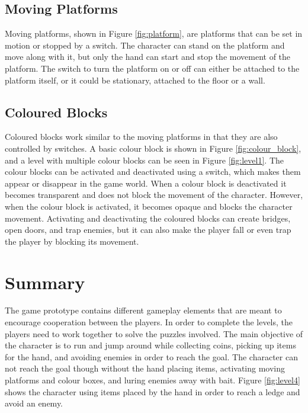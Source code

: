 \subsection{Moving Platforms}


Moving platforms, shown in Figure \ref{fig:platform}, are platforms that can be set in motion or stopped by a switch. The character can stand on the platform and move along with it, but only the hand can start and stop the movement of the platform. The switch to turn the platform on or off can either be attached to the platform itself, or it could be stationary, attached to the floor or a wall.

\subsection{Coloured Blocks}


 Coloured blocks work similar to the moving platforms in that they are also controlled by switches. A basic colour block is shown in Figure \ref{fig:colour_block}, and a level with multiple colour blocks can be seen in Figure \ref{fig:level1}. The colour blocks can be activated and deactivated using a switch, which makes them appear or disappear in the game world. When a colour block is deactivated it becomes transparent and does not block the movement of the character. However, when the colour block is activated, it becomes opaque and blocks the character movement. Activating and deactivating the coloured blocks can create bridges, open doors, and trap enemies, but it can also make the player fall or even trap the player by blocking its movement.

\section{Summary}
The game prototype contains different gameplay elements that are meant to encourage cooperation between the players. In order to complete the levels, the players need to work together to solve the puzzles involved. The main objective of the character is to run and jump around while collecting coins, picking up items for the hand, and avoiding enemies in order to reach the goal. The character can not reach the goal though without the hand placing items, activating moving platforms and colour boxes, and luring enemies away with bait. Figure \ref{fig:level4} shows the character using items placed by the hand in order to reach a ledge and avoid an enemy.

